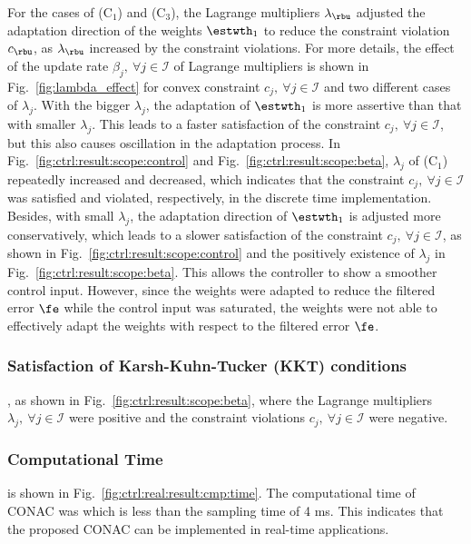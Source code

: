\documentclass[lettersize,journal]{IEEEtran}
\begin{document}
For the cases of (C$_1$) and (C$_3$), the Lagrange multipliers $\lambda_{\rbu}$ adjusted the adaptation direction of the weights $\estwth_1$ to reduce the constraint violation $c_{\rbu}$, as $\lambda_{\rbu}$ increased by the constraint violations.
For more details, the effect of the update rate $\beta_j,\ \forall j\in\mathcal I$ of Lagrange multipliers is shown in Fig.~\ref{fig:lambda_effect} for convex constraint $c_j,\ \forall j\in\mathcal I$ and two different cases of $\lambda_j$.
With the bigger $\lambda_j$, the adaptation of $\estwth_1$ is more assertive than that with smaller $\lambda_j$.
This leads to a faster satisfaction of the constraint $c_j,\ \forall j\in\mathcal I$, but this also causes oscillation in the adaptation process.
In Fig.~\ref{fig:ctrl:result:scope:control} and Fig.~\ref{fig:ctrl:result:scope:beta}, $\lambda_j$ of (C$_1$) repeatedly increased and decreased, which indicates that the constraint $c_j,\ \forall j\in\mathcal I$ was satisfied and violated, respectively, in the discrete time implementation.
Besides, with small $\lambda_j$, the adaptation direction of $\estwth_1$ is adjusted more conservatively, which leads to a slower satisfaction of the constraint $c_j,\ \forall j\in\mathcal I$, as shown in Fig.~\ref{fig:ctrl:result:scope:control} and the positively existence of $\lambda_j$ in Fig.~\ref{fig:ctrl:result:scope:beta}.
This allows the controller to show a smoother control input.
However, since the weights were adapted to reduce the filtered error $\fe$ while the control input was saturated, the weights were not able to effectively adapt the weights with respect to the filtered error $\fe$.

\subsubsection{Satisfaction of Karsh-Kuhn-Tucker (KKT) conditions}

\color{red}
, as shown in Fig.~\ref{fig:ctrl:result:scope:beta}, where the Lagrange multipliers $\lambda_j,\ \forall j\in\mathcal I$ were positive and the constraint violations $c_j,\ \forall j\in\mathcal I$ were negative.
\color{black}

\subsubsection{Computational Time}
is shown in Fig.~\ref{fig:ctrl:real:result:cmp:time}. The computational time of CONAC was 
 which is less than the sampling time of 4 ms. 
This indicates that the proposed CONAC can be implemented in real-time applications. 
\end{document}
